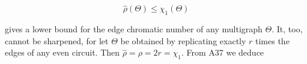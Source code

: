 $$\hat{\rho}(\Theta) \leq \chi_1(\Theta)$$

gives a lower bound for the edge chromatic number of any multigraph $\Theta$. It, too, cannot be sharpened, for let $\Theta$ be obtained by replicating exactly $r$ times the edges of any even circuit. Then $\hat{\rho} = \rho = 2r = \chi_1.$ From A37 we deduce
